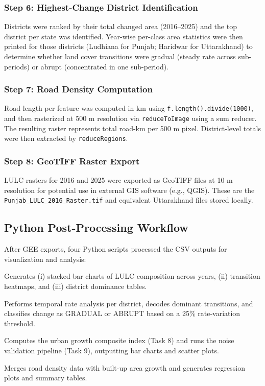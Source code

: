 \documentclass[12pt,a4paper]{article}
\begin{document}
\subsubsection{Step 6: Highest-Change District Identification}
Districts were ranked by their total changed area (2016--2025) and the top district per state was identified. Year-wise per-class area statistics were then printed for those districts (Ludhiana for Punjab; Haridwar for Uttarakhand) to determine whether land cover transitions were gradual (steady rate across sub-periods) or abrupt (concentrated in one sub-period).

\subsubsection{Step 7: Road Density Computation}
Road length per feature was computed in km using \texttt{f.length().divide(1000)}, and then rasterized at 500 m resolution via \texttt{reduceToImage} using a sum reducer. The resulting raster represents total road-km per 500 m pixel. District-level totals were then extracted by \texttt{reduceRegions}.

\subsubsection{Step 8: GeoTIFF Raster Export}
LULC rasters for 2016 and 2025 were exported as GeoTIFF files at 10 m resolution for potential use in external GIS software (e.g., QGIS). These are the \texttt{Punjab\_LULC\_2016\_Raster.tif} and equivalent Uttarakhand files stored locally.

\subsection{Python Post-Processing Workflow}

After GEE exports, four Python scripts processed the CSV outputs for visualization and analysis:

\begin{description}[leftmargin=2cm, style=nextline]
    \item[\texttt{LULC\_analysis.py}] Generates (i) stacked bar charts of LULC composition across years, (ii) transition heatmaps, and (iii) district dominance tables.
    \item[\texttt{Task23.py}] Performs temporal rate analysis per district, decodes dominant transitions, and classifies change as GRADUAL or ABRUPT based on a 25\% rate-variation threshold.
    \item[\texttt{Task89.py}] Computes the urban growth composite index (Task 8) and runs the noise validation pipeline (Task 9), outputting bar charts and scatter plots.
    \item[\texttt{road\_density\_analysis.py}] Merges road density data with built-up area growth and generates regression plots and summary tables.
\end{description}
\end{document}
